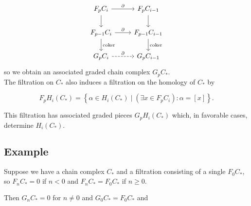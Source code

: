 \documentclass[reqno]{amsart}
\theoremstyle{definition}
\theoremstyle{remark}
\DeclareMathOperator{\coker}{coker}
\begin{document}
\begin{equation*}
\begin{tikzcd}
    F_p C_i \ar[d] \ar[r, "\partial"] & F_p C_{i-1} \ar[d] \\
    F_{p-1} C_i \ar[d, "\coker"]
    \ar[r, "\partial"] & F_{p-1} C_{i-1} \ar[d, "\coker"] \\
    G_p C_i \ar[r, "\partial", dashed] & G_p C_{i-1}
\end{tikzcd}
\end{equation*}
so we obtain an associated graded
chain complex $G_p C_*$.\\
\linebreak
The filtration on $C_*$ also induces
a filtration on the homology of $C_*$ by

\[
F_p H_i (C_*) = 
\left\{ \alpha \in 
H_i (C_*)  \mid 
\left( \exists x \in F_p C_i \right) \colon
\alpha = \left[ x \right] \right\} .
\] 

This filtration has associated graded pieces
$G_p H_i (C_*)$ which, in favorable cases, determine
$H_i (C_*)$.\\
\linebreak



\subsection{Example}

Suppose we have a chain complex
$C_*$ and a filtration consisting
of a single $F_0 C_*$, so
$F_n C_* = 0$ if
$n <0$ and
$F_n C_* = F_0 C_*$ if $n\ge 0$.

Then
$G_n C_* = 0$ for
$n \neq  0$ and
$G_0 C_* = F_0 C_*$ and



























\end{document}
